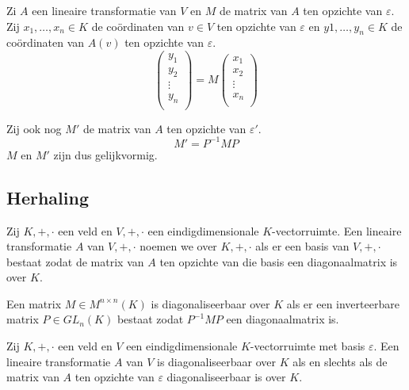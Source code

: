 \documentclass[main.tex]{subfiles}
\begin{document}
\begin{st}
  Zi $A$ een lineaire transformatie van $V$ en $M$ de matrix van $A$ ten opzichte van $\varepsilon$.
  Zij $x_{1},\dotsc,x_{n}\in K$ de co\"ordinaten van $v\in V$ ten opzichte van $\varepsilon$ en $y{1},\dotsc,y_{n}\in K$ de co\"ordinaten van $A(v)$ ten opzichte van $\varepsilon$.
  \[ 
  \begin{pmatrix}
    y_{1} \\ y_{2} \\ \vdots \\ y_{n}\\
  \end{pmatrix}
  =
  M
  \begin{pmatrix}
    x_{1} \\ x_{2} \\ \vdots \\ x_{n}\\
  \end{pmatrix}
  \]
\end{st}

\begin{st}
  Zij ook nog $M'$ de matrix van $A$ ten opzichte van $\varepsilon'$.
  \[ M' = P^{-1}MP \]
  $M$ en $M'$ zijn dus gelijkvormig.
\end{st}

\subsection{Herhaling}
\label{sec:herhaling-1}

\begin{de}
  Zij $K,+,\cdot$ een veld en $V,+,\cdot$ een eindigdimensionale $K$-vectorruimte.
  Een lineaire transformatie $A$ van $V,+,\cdot$ noemen we  over $K,+,\cdot$ als er een basis van $V,+,\cdot$ bestaat zodat de matrix van $A$ ten opzichte van die basis een diagonaalmatrix is over $K$.
\end{de}

\begin{de}
  Een matrix $M\in M^{n\times n}(K)$ is diagonaliseerbaar over $K$ als er een inverteerbare matrix $P\in GL_{n}(K)$ bestaat zodat $P^{-1}MP$ een diagonaalmatrix is.
\end{de}

\begin{ei}
  Zij $K,+,\cdot$ een veld en $V$ een eindigdimensionale $K$-vectorruimte met basis $\varepsilon$.
  Een lineaire transformatie $A$ van $V$ is diagonaliseerbaar over $K$ als en slechts als de matrix van $A$ ten opzichte van $\varepsilon$ diagonaliseerbaar is over $K$.
\end{ei}
\end{document}
